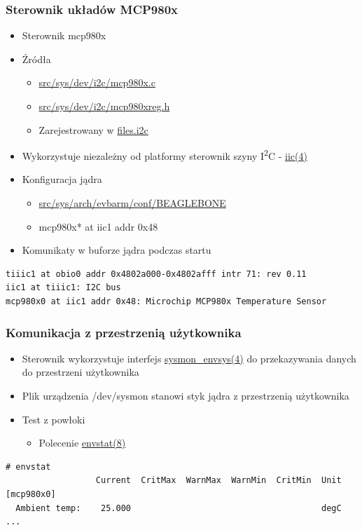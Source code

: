 \documentclass[dvipsnames,table]{beamer}
\begin{document}
\begin{frame}[fragile]
\frametitle{Sterownik układów MCP980x}
\begin{itemize}
	\item Sterownik mcp980x
	\item Źródła
	\begin{itemize}
		\item \href{http://nxr.netbsd.org/xref/src/sys/dev/i2c/mcp980x.c}{src/sys/dev/i2c/mcp980x.c}
		\item \href{http://nxr.netbsd.org/xref/src/sys/dev/i2c/mcp980xreg.h}{src/sys/dev/i2c/mcp980xreg.h}
		\item Zarejestrowany w \href{http://nxr.netbsd.org/xref/src/sys/dev/i2c/files.i2c}{files.i2c}
	\end{itemize}
	\item Wykorzystuje niezależny od platformy sterownik szyny I\textsuperscript{2}C - \href{http://netbsd.gw.com/cgi-bin/man-cgi?iic+9+NetBSD-current}{iic(4)}
	\item Konfiguracja jądra
	\begin{itemize}
		\item \href{http://nxr.netbsd.org/xref/src/sys/arch/evbarm/conf/BEAGLEBONE}{src/sys/arch/evbarm/conf/BEAGLEBONE}
		\item mcp980x* at iic1 addr 0x48
	\end{itemize}
	\item Komunikaty w buforze jądra podczas startu
\end{itemize}
\scriptsize
\begin{verbatim}
tiiic1 at obio0 addr 0x4802a000-0x4802afff intr 71: rev 0.11
iic1 at tiiic1: I2C bus
mcp980x0 at iic1 addr 0x48: Microchip MCP980x Temperature Sensor
\end{verbatim}
\end{frame}

\begin{frame}[fragile]
\frametitle{Komunikacja z przestrzenią użytkownika}
\begin{itemize}
	\item Sterownik wykorzystuje interfejs \href{http://netbsd.gw.com/cgi-bin/man-cgi?sysmon_envsys+9+NetBSD-current}{sysmon\_envsys(4)} do przekazywania danych do przestrzeni użytkownika
	\item Plik urządzenia /dev/sysmon stanowi styk jądra z przestrzenią użytkownika
	\item Test z powłoki
	\begin{itemize}
		\item Polecenie \href{http://netbsd.gw.com/cgi-bin/man-cgi?envstat+8+NetBSD-current}{envstat(8)}
	\end{itemize}
\end{itemize}
\scriptsize
\begin{verbatim}
# envstat
                  Current  CritMax  WarnMax  WarnMin  CritMin  Unit
[mcp980x0]
  Ambient temp:    25.000                                      degC
...
\end{verbatim}
\end{frame}
\end{document}
